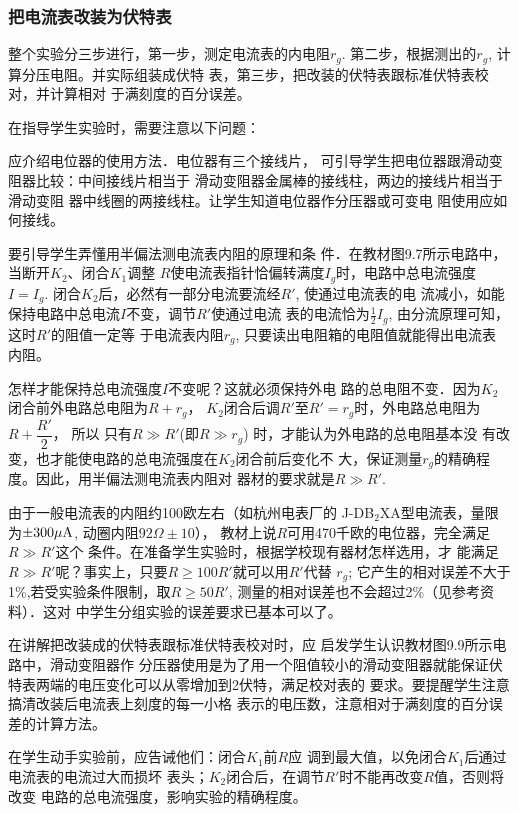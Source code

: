 \subsubsection{把电流表改装为伏特表}
整个实验分三步进行，第一步，测定电流表的内电阻$r_g$.
第二步，根据测出的$r_g$, 计算分压电阻。并实际组装成伏特
表，第三步，把改装的伏特表跟标准伏特表校对，并计算相对
于满刻度的百分误差。

在指导学生实验时，需要注意以下问题：

应介绍电位器的使用方法．电位器有三个接线片，
可引导学生把电位器跟滑动变阻器比较：中间接线片相当于
滑动变阻器金属棒的接线柱，两边的接线片相当于滑动变阻
器中线圈的两接线柱。让学生知道电位器作分压器或可变电
阻使用应如何接线。

要引导学生弄懂用半偏法测电流表内阻的原理和条
件．在教材图9.7所示电路中，当断开$K_2$、闭合$K_1$调整
$R$使电流表指针恰偏转满度$I_g$时，电路中总电流强度$I=I_g$.
闭合$K_2$后，必然有一部分电流要流经$R'$, 使通过电流表的电
流减小，如能保持电路中总电流$I$不变，调节$R'$使通过电流
表的电流恰为$\frac{1}{2}I_g$, 由分流原理可知，这时$R'$的阻值一定等
于电流表内阻$r_g$, 只要读出电阻箱的电阻值就能得出电流表
内阻。

怎样才能保持总电流强度$I$不变呢？这就必须保持外电
路的总电阻不变．因为$K_2$闭合前外电路总电阻为$R+r_g$，
$K_2$闭合后调$R'$至$R'=r_g$时，外电路总电阻为$R+\dfrac{R'}{2}$，
所以
只有$R\gg R'$(即$R\gg r_g$) 时，才能认为外电路的总电阻基本没
有改变，也才能使电路的总电流强度在$K_2$闭合前后变化不
大，保证测量$r_g$的精确程度。因此，用半偏法测电流表内阻对
器材的要求就是$R\gg R'$.

由于一般电流表的内阻约100欧左右（如杭州电表厂的
J-DB$_2$XA型电流表，量限为$\pm300\mu {\rm A}$, 动圈内阻$92{\Omega}\pm 10$），
教材上说$R$可用470千欧的电位器，完全满足$R\gg R'$这个
条件。在准备学生实验时，根据学校现有器材怎样选用，才
能满足$R\gg R'$呢？事实上，只要$R\ge 100R'$就可以用$R'$代替
$r_g$; 它产生的相对误差不大于1\%,若受实验条件限制，取$R\ge 
50R'$, 测量的相对误差也不会超过2\%（见参考资料）．这对
中学生分组实验的误差要求已基本可以了。

在讲解把改装成的伏特表跟标准伏特表校对时，应
启发学生认识教材图9.9所示电路中，滑动变阻器作
分压器使用是为了用一个阻值较小的滑动变阻器就能保证伏
特表两端的电压变化可以从零增加到2伏特，满足校对表的
要求。要提醒学生注意搞清改装后电流表上刻度的每一小格
表示的电压数，注意相对于满刻度的百分误差的计算方法。

在学生动手实验前，应告诫他们：闭合$K_1$前$R$应
调到最大值，以免闭合$K_1$后通过电流表的电流过大而损坏
表头；$K_2$闭合后，在调节$R'$时不能再改变$R$值，否则将改变
电路的总电流强度，影响实验的精确程度。

